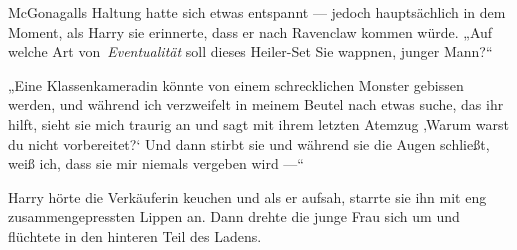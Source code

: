 McGonagalls Haltung hatte sich etwas entspannt — jedoch hauptsächlich in dem Moment, als Harry sie erinnerte, dass er nach Ravenclaw kommen würde.
„Auf welche Art von\linebreak\ \emph{Eventualität} soll dieses Heiler-Set Sie wappnen, junger Mann?“

„Eine Klassenkameradin könnte von einem schrecklichen Monster gebissen werden, und während ich verzweifelt in meinem Beutel nach etwas suche, das ihr hilft, sieht sie mich traurig an und sagt mit ihrem letzten Atemzug ‚Warum warst du nicht vorbereitet?‘ Und dann stirbt sie und während sie die Augen schließt, weiß ich, dass sie mir niemals vergeben wird —“

Harry hörte die Verkäuferin keuchen und als er aufsah, starrte sie ihn mit eng zusammengepressten Lippen an. Dann drehte die junge Frau sich um und flüchtete in den hinteren Teil des Ladens.

